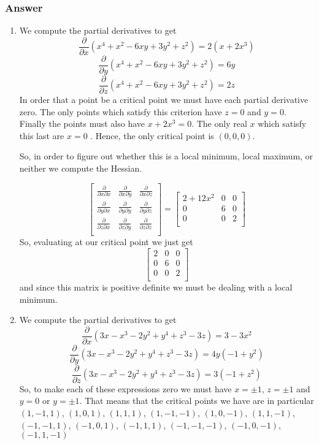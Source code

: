\documentclass[12pt]{article}
\begin{document}
\subsubsection{Answer}
\begin{enumerate}
\item
We compute the partial derivatives to get
\[\frac{\partial}{\partial x} \left( x^4+x^2-6xy+3y^2+z^2 \right) = 2 \left(x+2 x^3\right)\]
\[\frac{\partial}{\partial y} \left( x^4+x^2-6xy+3y^2+z^2 \right) = 6y\]
\[\frac{\partial}{\partial z} \left( x^4+x^2-6xy+3y^2+z^2 \right) = 2z \]
In order that a point be a critical point we must have each partial derivative zero. The only points which satisfy this criterion have $z=0$ and $y=0$. Finally the points must also have $x+2x^3=0$. The only real $x $ which satisfy this last are $x=0$  . Hence, the only critical point is $(0,0,0)$.

So, in order to figure out whether this is a local minimum, local maximum, or neither we compute the Hessian.

\[
\left[
\begin{array}{lcr}
\frac{\partial}{\partial x \partial x} & \frac{\partial}{\partial x \partial y} & \frac{\partial}{\partial x \partial z} \\
\frac{\partial}{\partial y \partial x} & \frac{\partial}{\partial y \partial y} & \frac{\partial}{\partial y \partial z }  \\
\frac{\partial}{\partial z \partial x } & \frac{\partial}{\partial z \partial y} & \frac{\partial}{\partial z \partial z} \\
\end{array}
\right]
=
\left[
\begin{array}{lcr}
2+12 x^2 & 0 &0\\
0 & 6 & 0  \\
0 & 0 & 2\\
\end{array}
\right]
\]
So, evaluating at our critical point we just get 
\[\left[
\begin{array}{lcr}
2 & 0 &0\\
0 & 6 & 0  \\
0 & 0 & 2\\
\end{array}
\right]
\]
and since this matrix is positive definite we must be dealing with  a local minimum. 
\item
We compute the partial derivatives to get
\[\frac{\partial}{\partial x} \left( 3x-x^3-2y^2+y^4+z^3-3z \right) = 3-3 x^2\]
\[\frac{\partial}{\partial y} \left( 3x-x^3-2y^2+y^4+z^3-3z \right) =4 y \left(-1+y^2\right) \]
\[\frac{\partial}{\partial z} \left( 3x-x^3-2y^2+y^4+z^3-3z \right) = 3 \left(-1+z^2\right)\]
So, to make each of these expressions zero we must have $x= \pm1$, $ z= \pm 1$ and $y=0 $ or $y=\pm 1$. That means that the critical points we have are in particular $(1,-1,1)$, $(1,0,1)$, $(1,1,1)$, $(1,-1,-1)$, $(1,0,-1)$, $(1,1,-1)$, $(-1,-1,1)$, $(-1,0,1)$, $(-1,1,1)$, $(-1,-1,-1)$, $(-1,0,-1)$, $(-1,1,-1)$ 


\end{enumerate}
\end{document}
